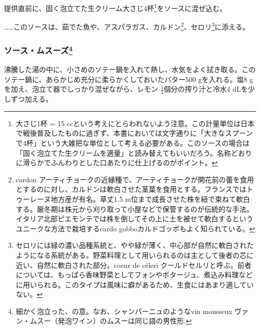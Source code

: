 \begin{recette}
提供直前に、固く泡立てた生クリーム大さじ4杯\footnote{大さじ1杯 = 15
  ccという考えにとらわれないよう注意。この計量単位は日本で戦後普及したものに過ぎず、本書においては文字通りに「大きなスプーンで4杯」という大雑把な単位として考える必要がある。このソースの場合は「固く泡立てた生クリームを適量」と読み替えてもいいだろう。名称どおりに滑らかでふんわりとした口あたりに仕上げるのがポイント。}をソースに混ぜ込む。

\ldots{}\ldots{}このソースは、茹でた魚や、アスパラガス、カルドン\footnote{cardon
  アーティチョークの近縁種で、アーティチョークが開花前の蕾を食用とするのに対し、カルドンは軟白させた茎葉を食用とする。フランスではトゥーレーヌ地方産が有名。草丈1.5
  m位まで成長させた株を紐で束ねて軟白する。厳冬期は株元から刈り取って小屋などで保管するのが伝統的な手法。イタリア北部ピエモンテでは株を倒してその上に土を被せて軟白するというユニークな方法で栽培するcardo
  gobboカルドゴッボもよく知られている。}、セロリ\footnote{セロリには緑の濃い品種系統と、やや緑が薄く、中心部が自然に軟白されたようになる系統がある。野菜料理として用いられるのは主として後者の芯に近い、自然に軟白された部分。coeur
  de céleri
  クールドセルリと呼ぶ。前者については、もっぱら香味野菜としてフォンやポタージュ、煮込み料理などに用いられる。このタイプは風味に癖があるため、生食にはあまり適していない。}に添える。

\hypertarget{sauce-mousseuse}{%
\subsubsection[ソース・ムスーズ]{\texorpdfstring{ソース・ムスーズ\footnote{細かく泡立った、の意。なお、シャンパーニュのようなvin
  mousseux ヴァン・ムスー（発泡ワイン）のムスーは同じ語の男性形.}}{ソース・ムスーズ}}\label{sauce-mousseuse}}



沸騰した湯の中に、小さめのソテー鍋を入れて熱し、水気をよく拭き取る。このソテー鍋に、あらかじめ充分に柔らかくしておいたバター500
gを入れる。塩8 gを加え、泡立て器でしっかり混ぜながら、レモン
\(\frac{1}{4}\)個分の搾り汁と冷水4 dLを少しずつ加える。


\end{recette}
